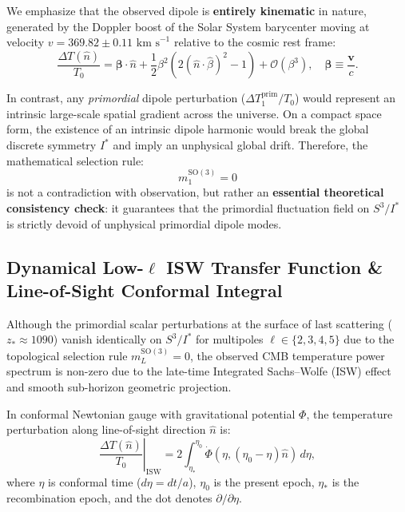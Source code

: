 \documentclass[11pt,a4paper]{article}
\theoremstyle{definition}
\newcommand{\SO}{\mathrm{SO}}
\begin{document}
We emphasize that the observed dipole is \textbf{entirely kinematic} in nature, generated by the Doppler boost of the Solar System barycenter moving at velocity $v = 369.82 \pm 0.11\text{ km s}^{-1}$ relative to the cosmic rest frame:
\begin{equation}
\frac{\Delta T(\hat{n})}{T_0} = \boldsymbol{\beta} \cdot \hat{n} + \frac{1}{2}\beta^2 \left( 2(\hat{n} \cdot \hat{\beta})^2 - 1 \right) + \mathcal{O}(\beta^3), \quad \boldsymbol{\beta} \equiv \frac{\mathbf{v}}{c}.
\end{equation}

In contrast, any \textit{primordial} dipole perturbation ($\Delta T_1^{\mathrm{prim}} / T_0$) would represent an intrinsic large-scale spatial gradient across the universe. On a compact space form, the existence of an intrinsic dipole harmonic would break the global discrete symmetry $I^*$ and imply an unphysical global drift. Therefore, the mathematical selection rule:
\begin{equation}
m_1^{\SO(3)} = 0
\end{equation}
is not a contradiction with observation, but rather an \textbf{essential theoretical consistency check}: it guarantees that the primordial fluctuation field on $S^3 / I^*$ is strictly devoid of unphysical primordial dipole modes.
\subsection{Dynamical Low-$\ell$ ISW Transfer Function \& Line-of-Sight Conformal Integral}

Although the primordial scalar perturbations at the surface of last scattering ($z_* \approx 1090$) vanish identically on $S^3/I^*$ for multipoles $\ell \in \{2, 3, 4, 5\}$ due to the topological selection rule $m_L^{\SO(3)} = 0$, the observed CMB temperature power spectrum is non-zero due to the late-time Integrated Sachs--Wolfe (ISW) effect and smooth sub-horizon geometric projection.

In conformal Newtonian gauge with gravitational potential $\Phi$, the temperature perturbation along line-of-sight direction $\hat{n}$ is:
\begin{equation}
\left. \frac{\Delta T(\hat{n})}{T_0} \right|_{\mathrm{ISW}} = 2 \int_{\eta_*}^{\eta_0} \dot{\Phi}(\eta, (\eta_0 - \eta)\hat{n})\,d\eta,
\end{equation}
where $\eta$ is conformal time ($d\eta = dt/a$), $\eta_0$ is the present epoch, $\eta_*$ is the recombination epoch, and the dot denotes $\partial/\partial\eta$.
\end{document}
